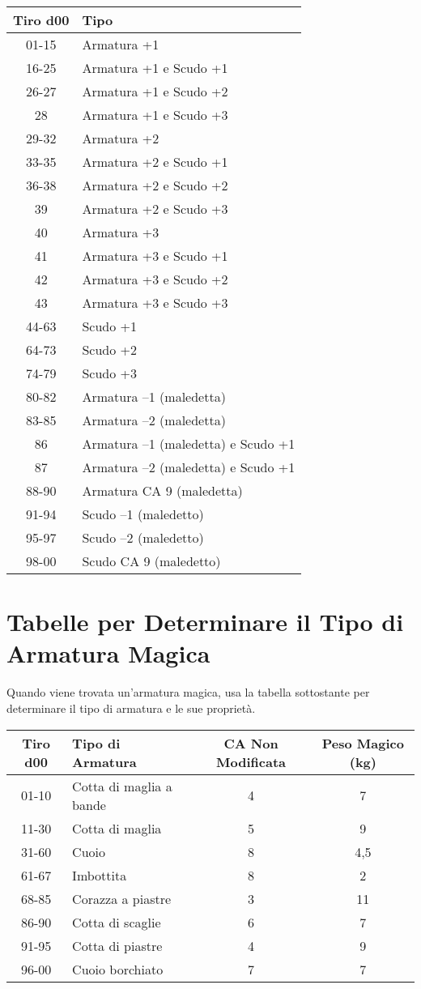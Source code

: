 \documentclass{article}
\begin{document}
\begin{multicols}{2}
\begin{tabular}{|c|l|}
\hline
\textbf{Tiro d00} & \textbf{Tipo} \\
\hline
01-15 & Armatura +1 \\
16-25 & Armatura +1 e Scudo +1 \\
26-27 & Armatura +1 e Scudo +2 \\
28 & Armatura +1 e Scudo +3 \\
29-32 & Armatura +2 \\
33-35 & Armatura +2 e Scudo +1 \\
36-38 & Armatura +2 e Scudo +2 \\
39 & Armatura +2 e Scudo +3 \\
40 & Armatura +3 \\
41 & Armatura +3 e Scudo +1 \\
42 & Armatura +3 e Scudo +2 \\
43 & Armatura +3 e Scudo +3 \\
44-63 & Scudo +1 \\
64-73 & Scudo +2 \\
74-79 & Scudo +3 \\
80-82 & Armatura –1 (maledetta) \\
83-85 & Armatura –2 (maledetta) \\
86 & Armatura –1 (maledetta) e Scudo +1 \\
87 & Armatura –2 (maledetta) e Scudo +1 \\
88-90 & Armatura CA 9 (maledetta) \\
91-94 & Scudo –1 (maledetto) \\
95-97 & Scudo –2 (maledetto) \\
98-00 & Scudo CA 9 (maledetto) \\
\hline

\end{tabular}

\section{Tabelle per Determinare il Tipo di Armatura Magica}

Quando viene trovata un'armatura magica, usa la tabella sottostante per determinare il tipo di armatura e le sue proprietà.

\begin{table}[h]
\centering
\begin{tabular}{|c|l|c|c|}
\hline
\textbf{Tiro d00} & \textbf{Tipo di Armatura} & \textbf{CA Non Modificata} & \textbf{Peso Magico (kg)} \\
\hline
01-10 & Cotta di maglia a bande & 4 & 7 \\
11-30 & Cotta di maglia & 5 & 9 \\
31-60 & Cuoio & 8 & 4,5 \\
61-67 & Imbottita & 8 & 2 \\
68-85 & Corazza a piastre & 3 & 11 \\
86-90 & Cotta di scaglie & 6 & 7 \\
91-95 & Cotta di piastre & 4 & 9 \\
96-00 & Cuoio borchiato & 7 & 7 \\
\hline
\end{tabular}


\end{table}
\end{multicols}
\end{document}
